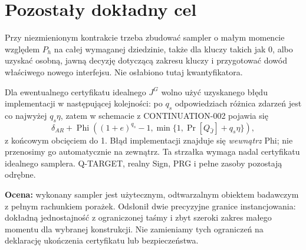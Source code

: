 \documentclass[11pt,a4paper]{article}
\newcommand{\PhiB}{\operatorname{Phi}}
\begin{document}
\section{Pozostały dokładny cel}
Przy niezmienionym kontrakcie trzeba zbudować sampler o małym momencie
względem $P_h$ na całej wymaganej dziedzinie, także dla kluczy takich jak $0$,
albo uzyskać osobną, jawną decyzję dotyczącą zakresu kluczy i przygotować
dowód właściwego nowego interfejsu. Nie osłabiono tutaj kwantyfikatora.

Dla ewentualnego certyfikatu idealnego $J^G$ wolno użyć uzyskanego
błędu implementacji w następującej kolejności: po $q_s$ odpowiedziach
różnica zdarzeń jest co najwyżej $q_s\eta$, zatem w schemacie z
CONTINUATION-002 pojawia się
\[
 \delta_{AR}+\PhiB\!\left((1+e)^{q_s}-1,
       \min\{1,\Pr[Q_{\widehat J}]+q_s\eta\}\right),
\]
z końcowym obcięciem do 1. Błąd implementacji znajduje się
\emph{wewnątrz} Phi; nie przenosimy go automatycznie na zewnątrz.
Ta strzałka wymaga nadal certyfikatu idealnego samplera.
Q-TARGET, realny Sign, PRG i pełne zasoby pozostają odrębne.

\textbf{Ocena:} wykonany sampler jest użytecznym, odtwarzalnym obiektem
badawczym z pełnym rachunkiem porażek. Odsłonił dwie precyzyjne granice
instancjowania: dokładną jednostajność z ograniczonej taśmy i zbyt szeroki
zakres małego momentu dla wybranej konstrukcji. Nie zamieniamy tych
ograniczeń na deklarację ukończenia certyfikatu lub bezpieczeństwa.
\end{document}
